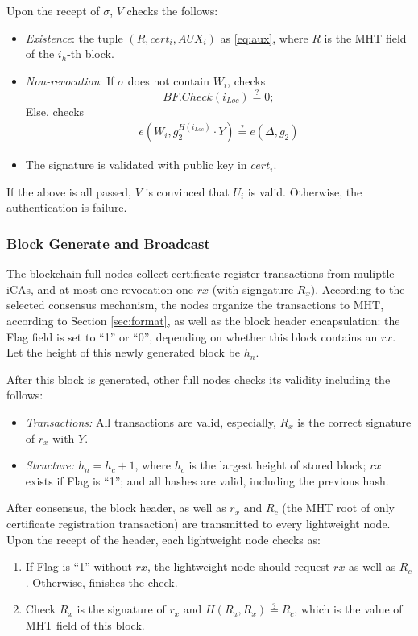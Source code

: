 \documentclass[conference]{IEEEtran}
\begin{document}
Upon the recept of $\sigma$, $V$ checks the follows:
\begin{itemize}
	\item \textit{Existence}: the tuple $(R, cert_i, AUX_i)$ as \eqref{eq:aux}, where $R$ is the MHT field of the $i_h$-th block.
	\item \textit{Non-revocation}: If $\sigma$ does not contain $W_i$, checks $$BF.Check(i_{Loc})\overset{?}{=} 0;$$ Else, checks 
	\begin{align} \label{eq:authenticate}
		e(W_i, g_2^{H(i_{Loc})}\cdot Y) \overset{?}{=} e(\Delta, g_2)
	\end{align}
	\item The signature is validated with public key in $cert_i$.
\end{itemize}
If the above is all passed, $V$ is convinced that $U_i$ is valid. Otherwise, the authentication is failure. 


\subsubsection{Block Generate and Broadcast}\label{section:block_consensus}

The blockchain full nodes collect certificate register transactions from muliptle iCAs, and at most one revocation one $rx$ (with signgature $R_x$). According to the selected consensus mechanism, the nodes organize the transactions to MHT, according to Section \ref{sec:format}, as well as the block header encapsulation: the Flag field is set to ``1'' or ``0'', depending on whether this block contains an $rx$. Let the height of this newly generated block be $h_n$.

After this block is generated, other full nodes checks its validity including the follows:
\begin{itemize}
	\item \textit{Transactions:} All transactions are valid, especially, $R_x$ is the correct signature of $r_x$ with $Y$.
	\item \textit{Structure:} $h_n = h_c + 1$, where $h_c$ is the largest height of stored block; $rx$ exists if Flag is ``1''; and all hashes are valid, including the previous hash.
\end{itemize}

After consensus, the block header, as well as $r_x$ and $R_c$ (the MHT root of only certificate registration transaction) are transmitted to every lightweight node. 
Upon the recept of the header, each lightweight node checks as: 
\begin{enumerate}
	\item If Flag is ``1'' without $rx$, the lightweight node should request $rx$ as well as $R_c$. Otherwise, finishes the check.
	\item  Check $R_x$ is the signature of $r_x$ and $H(R_a, R_x) \overset{?}{=} R_c$, which is the value of MHT field of this block. 
\end{enumerate}
\end{document}
